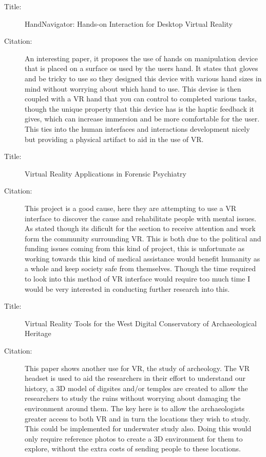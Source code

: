 \documentclass{scrartcl}
\begin{document}
\begin{description}
		\item[Title:] HandNavigator: Hands-on Interaction for Desktop Virtual Reality
		\item[Citation:] \cite{Kry}
		An interesting paper, it proposes the use of hands on manipulation device that is placed on a surface os used by the users hand. It states that gloves and be tricky to use so they designed this device with various hand sizes in mind without worrying about which hand to use. This devise is then coupled with a VR hand that you can control to completed various tasks, though the unique property that this device has is the haptic feedback it gives, which can increase immersion and be more comfortable for the user. This ties into the human interfaces and interactions development nicely but providing a physical artifact to aid in the use of VR.

		\item[Title:] Virtual Reality Applications in Forensic Psychiatry
		\item[Citation:] \cite{Benbouriche}
		This project is a good cause, here they are attempting to use a VR interface to discover the cause and rehabilitate people with mental issues. As stated though its dificult for the section to receive attention and work form the community surrounding VR. This is both due to the political and funding issues coming from this kind of project, this is unfortunate as working towards this kind of medical assistance would benefit humanity as a whole and keep society safe from themselves. Though the time required to look into this method of VR interface would require too much time I would be very interested in conducting further research into this.

		\item[Title:] Virtual Reality Tools for the West Digital Conservatory of Archaeological Heritage
		\item[Citation:] \cite{Barreau}
		This paper shows another use for VR, the study of archeology. The VR headset is used to aid the researchers in their effort to understand our history, a 3D model of digsites and/or temples are created to allow the researchers to study the ruins without worrying about damaging the environment around them. The key here is to allow the archaeologists greater access to both VR and in turn the locations they wish to study. This could be implemented for underwater study also. Doing this would only require reference photos to create a 3D environment for them to explore, without the extra costs of sending people to these locations.


	\end{description}

	

											
	
	
											
\end{document}
